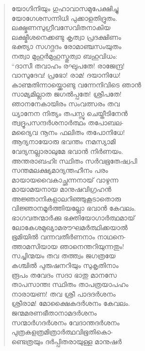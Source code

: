 \begin{verse}
യോഗിനിയും ഗുഹാവാസമുപേക്ഷിച്ചു\\
യോഗേശസന്നിധി പുക്കാളതിദ്രുതം.\\
ലക്ഷ്മണസുഗ്രീവസേവിതനാകിയ\\
ലക്ഷ്മീശനെക്കണ്ടു കൃത്വാ പ്രദക്ഷിണം\\
ഭക്ത്യാ സഗദ്ഗദം രോമാഞ്ചസംയുതം\\
നത്വാ മുഹുര്‍മുഹുസ്തുത്വാ ബഹുവിധം:\\
“ദാസീ തവാഹം രഘുപതേ! രാജേന്ദ്ര!\\
വാസുദേവ! പ്രഭോ! രാമ! ദയാനിധേ!\\
കാണ്മതിന്നായ്ക്കൊണ്ടു വന്നേനിവിടെ ഞാന്‍\\
സാമ്യമില്ലാത ജഗല്‍പ്പതേ! ശ്രീപതേ!\\
ഞാനനേകായിരം സംവത്സരം തവ\\
ധ്യാനേന നിത്യം തപസ്സു ചെയ്തീടിനേന്‍\\
ത്വദ്രൂപസന്ദര്‍ശനാര്‍ത്ഥം തപോബല-\\
മദ്യൈവ നൂനം ഫലിതം തപോനിധേ!\\
ആദ്യനായോരു ഭവന്തം നമസ്യാമി\\
വേദ്യനല്ലാരാലുമേ ഭവാന്‍ നിര്‍ണയം.\\
അന്തരാ‍ബഹിഃ സ്ഥിതം സര്‍വഭൂതേഷ്വപി\\
സന്തമലക്ഷ്യമാദ്യന്തഹീനം പരം\\
മായായവൈകാച്ഛന്നനായ് വാഴുന്ന\\
മായാമയനായ മാനുഷവിഗ്രഹന്‍\\
അജ്ഞാനികളാലറിഞ്ഞുകൂടാതൊരു\\
വിജ്ഞാനമൂര്‍ത്തിയല്ലോ ഭവാന്‍ കേവലം.\\
ഭാഗവതന്മാര്‍ക്കു ഭക്തിയോഗാര്‍ത്ഥമായ്\\
ലോകേശമുഖ്യാമരൗഘമര്‍ത്ഥിക്കയാല്‍\\
ഭൂമിയില്‍ വന്നവതീര്‍ണനാം നാഥനെ-\\
ത്താമസിയായ ഞാനെന്തറിയുന്നതും!\\
സച്ചിന്മയം തവ തത്ത്വം ജഗത്രയേ\\
കശ്ചില്‍ പുരുഷനറിയും സുകൃതിനാം\\
രൂപം തവേദം സദാ ഭാതു മാനസേ\\
താപസാന്തഃ സ്ഥിതം താപത്രയാപഹം\\
നാരായണ! തവ ശ്രീ പാദദര്‍ശനം\\
ശ്രീരാമ! മോക്ഷൈകദര്‍ശനം കേവലം.\\
ജന്മമരണഭീതാനാമദര്‍ശനം\\
സന്മാര്‍ഗദര്‍ശനം വേദാന്തദര്‍ശനം\\
പുത്രകളത്രമിത്രാര്‍ത്ഥവിഭൂതികൊ-\\
ണ്ടെത്രയും ദര്‍പ്പിതരായുള്ള മാനുഷര്‍\\

\end{verse}
